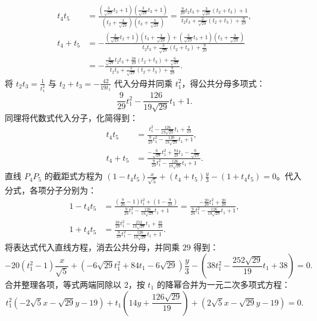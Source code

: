 \begin{solution}
\begin{align*}
t_4 t_5 &= \frac{\left(\frac{3}{\sqrt{29}} t_2 + 1\right)\left(\frac{3}{\sqrt{29}} t_3 + 1\right)}{\left(t_2 + \frac{3}{\sqrt{29}}\right)\left(t_3 + \frac{3}{\sqrt{29}}\right)} = \frac{\frac{9}{29} t_2 t_3 + \frac{3}{\sqrt{29}}(t_2+t_3) + 1}{t_2 t_3 + \frac{3}{\sqrt{29}}(t_2+t_3) + \frac{9}{29}}, \\
t_4 + t_5 &= -\frac{\left(\frac{3}{\sqrt{29}} t_2 + 1\right)\left(t_3 + \frac{3}{\sqrt{29}}\right) + \left(\frac{3}{\sqrt{29}} t_3 + 1\right)\left(t_2 + \frac{3}{\sqrt{29}}\right)}{t_2 t_3 + \frac{3}{\sqrt{29}}(t_2+t_3) + \frac{9}{29}} \\
&= -\frac{\frac{6}{\sqrt{29}} t_2 t_3 + \frac{38}{29}(t_2+t_3) + \frac{6}{\sqrt{29}}}{t_2 t_3 + \frac{3}{\sqrt{29}}(t_2+t_3) + \frac{9}{29}}.
\end{align*}
将 $t_2 t_3 = \frac{1}{t_1^2}$ 与 $t_2 + t_3 = -\frac{42}{19 t_1}$ 代入分母并同乘 $t_1^2$，得公共分母多项式：
\[
\frac{9}{29} t_1^2 - \frac{126}{19\sqrt{29}} t_1 + 1.
\]
同理将代数式代入分子，化简得到：
\begin{align*}
t_4 t_5 &= \frac{t_1^2 - \frac{126}{19\sqrt{29}} t_1 + \frac{9}{29}}{\frac{9}{29} t_1^2 - \frac{126}{19\sqrt{29}} t_1 + 1}, \\
t_4 + t_5 &= \frac{-\frac{6}{\sqrt{29}} t_1^2 + \frac{84}{29} t_1 - \frac{6}{\sqrt{29}}}{\frac{9}{29} t_1^2 - \frac{126}{19\sqrt{29}} t_1 + 1}.
\end{align*}
直线 $P_4P_5$ 的截距式方程为 $(1 - t_4 t_5) \frac{x}{\sqrt{5}} + (t_4 + t_5) \frac{y}{3} - (1 + t_4 t_5) = 0$。代入分式，各项分子分别为：
\begin{align*}
1 - t_4 t_5 &= \frac{\left(\frac{9}{29} - 1\right) t_1^2 + \left(1 - \frac{9}{29}\right)}{\frac{9}{29} t_1^2 - \frac{126}{19\sqrt{29}} t_1 + 1} = \frac{-\frac{20}{29} t_1^2 + \frac{20}{29}}{\frac{9}{29} t_1^2 - \frac{126}{19\sqrt{29}} t_1 + 1}, \\
1 + t_4 t_5 &= \frac{\frac{38}{29} t_1^2 - \frac{252}{19\sqrt{29}} t_1 + \frac{38}{29}}{\frac{9}{29} t_1^2 - \frac{126}{19\sqrt{29}} t_1 + 1}.
\end{align*}
将表达式代入直线方程，消去公共分母，并同乘 $29$ 得到：
\[
-20(t_1^2 - 1) \frac{x}{\sqrt{5}} + \left(-6\sqrt{29} t_1^2 + 84 t_1 - 6\sqrt{29}\right) \frac{y}{3} - \left(38 t_1^2 - \frac{252\sqrt{29}}{19} t_1 + 38\right) = 0.
\]
合并整理各项，等式两端同除以 $2$，按 $t_1$ 的降幂合并为一元二次多项式方程：
\[
t_1^2 \left( -2\sqrt{5} x - \sqrt{29} y - 19 \right) + t_1 \left( 14 y + \frac{126\sqrt{29}}{19} \right) + \left( 2\sqrt{5} x - \sqrt{29} y - 19 \right) = 0.
\]
\end{solution}
